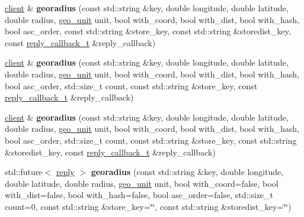 \begin{DoxyCompactItemize}
\hyperlink{classcpp__redis_1_1client}{client} \& {\bfseries georadius} (const std\+::string \&key, double longitude, double latitude, double radius, \hyperlink{classcpp__redis_1_1client_aa5998536fd32ff4387c89be514997620}{geo\+\_\+unit} unit, bool with\+\_\+coord, bool with\+\_\+dist, bool with\+\_\+hash, bool asc\+\_\+order, const std\+::string \&store\+\_\+key, const std\+::string \&storedist\+\_\+key, const \hyperlink{classcpp__redis_1_1client_a061a1140d36d2eaeda82b09a0bb3f9f2}{reply\+\_\+callback\+\_\+t} \&reply\+\_\+callback)
\item 
\mbox{\label{classcpp__redis_1_1client_a24ecf7d69b13f1f2e5a1250e83f1379f}} 
\hyperlink{classcpp__redis_1_1client}{client} \& {\bfseries georadius} (const std\+::string \&key, double longitude, double latitude, double radius, \hyperlink{classcpp__redis_1_1client_aa5998536fd32ff4387c89be514997620}{geo\+\_\+unit} unit, bool with\+\_\+coord, bool with\+\_\+dist, bool with\+\_\+hash, bool asc\+\_\+order, std\+::size\+\_\+t count, const std\+::string \&store\+\_\+key, const \hyperlink{classcpp__redis_1_1client_a061a1140d36d2eaeda82b09a0bb3f9f2}{reply\+\_\+callback\+\_\+t} \&reply\+\_\+callback)
\item 
\mbox{\label{classcpp__redis_1_1client_aa9fe2141df3d4cf5727981a61fe47e13}} 
\hyperlink{classcpp__redis_1_1client}{client} \& {\bfseries georadius} (const std\+::string \&key, double longitude, double latitude, double radius, \hyperlink{classcpp__redis_1_1client_aa5998536fd32ff4387c89be514997620}{geo\+\_\+unit} unit, bool with\+\_\+coord, bool with\+\_\+dist, bool with\+\_\+hash, bool asc\+\_\+order, std\+::size\+\_\+t count, const std\+::string \&store\+\_\+key, const std\+::string \&storedist\+\_\+key, const \hyperlink{classcpp__redis_1_1client_a061a1140d36d2eaeda82b09a0bb3f9f2}{reply\+\_\+callback\+\_\+t} \&reply\+\_\+callback)
\item 
\mbox{\label{classcpp__redis_1_1client_a0a7d62282d055a3bbf5949b077841ed8}} 
std\+::future$<$ \hyperlink{classcpp__redis_1_1reply}{reply} $>$ {\bfseries georadius} (const std\+::string \&key, double longitude, double latitude, double radius, \hyperlink{classcpp__redis_1_1client_aa5998536fd32ff4387c89be514997620}{geo\+\_\+unit} unit, bool with\+\_\+coord=false, bool with\+\_\+dist=false, bool with\+\_\+hash=false, bool asc\+\_\+order=false, std\+::size\+\_\+t count=0, const std\+::string \&store\+\_\+key=\char`\"{}\char`\"{}, const std\+::string \&storedist\+\_\+key=\char`\"{}\char`\"{})

\end{DoxyCompactItemize}
